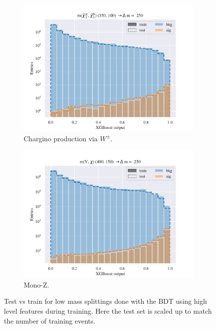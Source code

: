 \begin{figure}[H]
    \begin{subfigure}[t!]{0.49\textwidth}
        \includegraphics[width = \textwidth]{Figures/WW/BDT/High_level/Inter/scaled_train_test_395320.pdf}
        \caption{Chargino production via $W^\pm$.}
        \label{fig:}
    \end{subfigure}
    \begin{subfigure}[t!]{0.49\textwidth}
        \includegraphics[width = \textwidth]{Figures/Mono_Z/ML/BDT/High_level/Inter/scaled_train_test_310613.pdf}
        \caption{Mono-Z.}
        \label{fig:}
    \end{subfigure}
    \caption{Test vs train for low mass splittings done with the BDT using high level features during training. Here the test set is scaled up to match the number of training events.}
    \label{fig:Non}
\end{figure}




